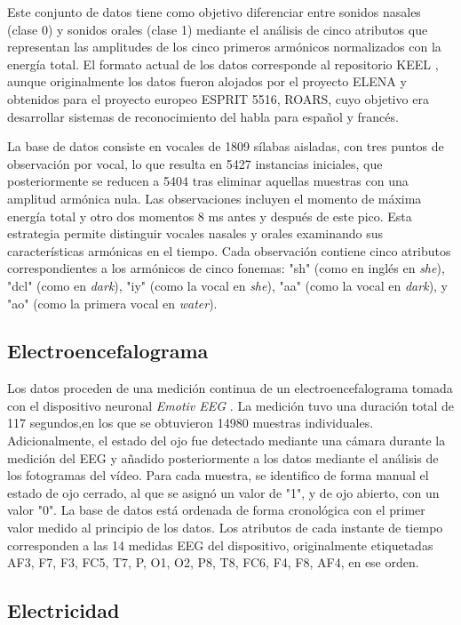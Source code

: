 Este conjunto de datos tiene como objetivo diferenciar entre sonidos nasales (clase 0) y sonidos orales (clase 1) mediante el análisis de cinco atributos que representan las amplitudes de los cinco primeros armónicos normalizados con la energía total. El formato actual de los datos corresponde al repositorio KEEL \cite{keel-repo}, aunque originalmente los datos fueron alojados por el proyecto ELENA y obtenidos para el proyecto europeo ESPRIT 5516, ROARS, cuyo objetivo era desarrollar sistemas de reconocimiento del habla para español y francés.

La base de datos consiste en vocales de 1809 sílabas aisladas, con tres puntos de observación por vocal, lo que resulta en 5427 instancias iniciales, que posteriormente se reducen a 5404 tras eliminar aquellas muestras con una amplitud armónica nula. Las observaciones incluyen el momento de máxima energía total y otro dos momentos 8 ms antes y después de este pico. Esta estrategia permite distinguir vocales nasales y orales examinando sus características armónicas en el tiempo. Cada observación contiene cinco atributos correspondientes a los armónicos de cinco fonemas: "sh" (como en inglés en \emph{she}), "dcl" (como en \emph{dark}), "iy" (como la vocal en \emph{she}), "aa" (como la vocal en \emph{dark}), y "ao" (como la primera vocal en \emph{water}).

\subsection{Electroencefalograma}

Los datos proceden de una medición continua de un electroencefalograma tomada con el dispositivo neuronal \emph{Emotiv EEG} \cite{eeg-eye-dataset}. La medición tuvo una duración total de 117 segundos,en los que se obtuvieron 14980 muestras individuales. Adicionalmente, el estado del ojo fue detectado mediante una cámara durante la medición del EEG y añadido posteriormente a los datos mediante el análisis de los fotogramas del vídeo. Para cada muestra, se identifico de forma manual el estado de ojo cerrado, al que se asignó un valor de "1", y de ojo abierto, con un valor "0". La base de datos está ordenada de forma cronológica con el primer valor medido al principio de los datos. Los atributos de cada instante de tiempo corresponden a las 14 medidas EEG del dispositivo, originalmente etiquetadas AF3, F7, F3, FC5, T7, P, O1, O2, P8, T8, FC6, F4, F8, AF4, en ese orden.

\subsection{Electricidad}


